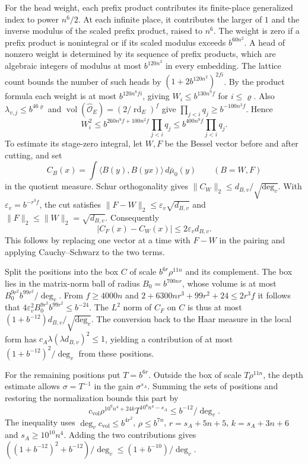 For the head weight, each prefix product contributes its finite-place
generalized index to power \(n^6/2\). At each infinite place, it
contributes the larger of \(1\) and the inverse modulus of the scaled
prefix product, raised to \(n^6\). The weight is zero if a prefix product
is nonintegral or if its scaled modulus exceeds \(b^{60n^2}\).
A head of nonzero weight is determined by its sequence of prefix
products, which are algebraic integers of modulus at most \(b^{120n^2}\)
in every embedding. The lattice count bounds the number of such heads
by \((1+2b^{120n^2})^{2fi}\). By the product formula each weight is at
most \(b^{120n^8fi}\), giving \(W_i\le b^{130n^9f}\) for \(i\le\varrho\).
Also \(\lambda_{v,j}\le b^{46\varrho}\) and
\(\operatorname{vol}(\widehat{\mathcal O}_E)=(2/\operatorname{rd}_E)^f\)
give \(\prod_{j<i}q_j\ge b^{-100n^2f}\). Hence
\[
 W_i^2\le b^{260n^9f+100n^2f}\prod_{j<i}q_j
       \le b^{400n^9f}\prod_{j<i}q_j .
\]
To estimate its stage-zero integral, let \(W,F\) be the Bessel vector
before and after cutting, and set
\[
 C_B(x)=\int\langle B(y),B(yx)\rangle\,d\bar\mu_0(y)
 \qquad(B=W,F)
\]
in the quotient measure. Schur orthogonality gives
\(\|C_W\|_2\le d_{B,v}/\sqrt{\deg_v}\).
With \(\varepsilon_v=b^{-r^3 f}\), the cut satisfies
\(\|F-W\|_2\le\varepsilon_v\sqrt{d_{B,v}}\) and
\(\|F\|_2\le\|W\|_2=\sqrt{d_{B,v}}\). Consequently
\[
 |C_F(x)-C_W(x)|\le2\varepsilon_v d_{B,v}.
\]
This follows by replacing one vector at a time with \(F-W\) in the
pairing and applying Cauchy--Schwarz to the two terms.

Split the positions into the box \(C\) of scale \(b^{6r}\rho^{11n}\)
and its complement. The box lies in the matrix-norm ball of radius
\(B_0=b^{700nr}\), whose volume is at most
\(B_0^{9r^2}b^{99r^2}/\deg_v\).
From \(f\ge4000n\) and
\(2+6300nr^3+99r^2+24\le 2r^3 f\) it follows that
\(4\varepsilon_v^2 B_0^{9r^2}b^{99r^2}\le b^{-24}\).
The \(L^2\) norm of \(C_F\) on \(C\) is thus at most
\((1+b^{-12})d_{B,v}/\sqrt{\deg_v}\).
The conversion back to the Haar measure in the local form has
\(c_A\lambda(\lambda d_{B,v})^2\le1\), yielding a contribution of at most
\((1+b^{-12})^2/\deg_v\) from these positions.

For the remaining positions put \(T=b^{6r}\).
Outside the box of scale \(T\rho^{11n}\), the depth estimate allows
\(\sigma=T^{-1}\) in the gain \(\sigma^{s_A}\).
Summing the sets of positions and restoring the normalization bounds
this part by
\[
 c_{\mathrm{vol}}\rho^{10^9n^4+24k}T^{10^8n^4-s_A}
 \le b^{-12}/\deg_v .
\]
The inequality uses
\(\deg_v c_{\mathrm{vol}}\le b^{4r^2}\), \(\rho\le b^{7n}\),
\(r=s_A+5n+5\), \(k=s_A+3n+6\) and \(s_A\ge10^{10}n^4\).
Adding the two contributions gives
\(((1+b^{-12})^2+b^{-12})/\deg_v\le(1+b^{-10})/\deg_v\).

